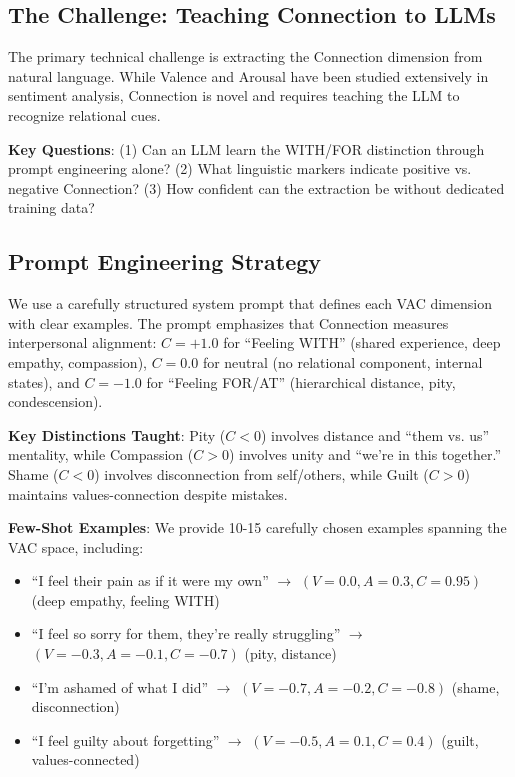 \subsection{The Challenge: Teaching Connection to LLMs}

The primary technical challenge is extracting the Connection dimension from natural language. While Valence and Arousal have been studied extensively in sentiment analysis, Connection is novel and requires teaching the LLM to recognize relational cues.

\textbf{Key Questions}: (1) Can an LLM learn the WITH/FOR distinction through prompt engineering alone? (2) What linguistic markers indicate positive vs. negative Connection? (3) How confident can the extraction be without dedicated training data?

\subsection{Prompt Engineering Strategy}

We use a carefully structured system prompt that defines each VAC dimension with clear examples. The prompt emphasizes that Connection measures interpersonal alignment: $C = +1.0$ for ``Feeling WITH'' (shared experience, deep empathy, compassion), $C = 0.0$ for neutral (no relational component, internal states), and $C = -1.0$ for ``Feeling FOR/AT'' (hierarchical distance, pity, condescension).

\textbf{Key Distinctions Taught}: Pity ($C < 0$) involves distance and ``them vs. us'' mentality, while Compassion ($C > 0$) involves unity and ``we're in this together.'' Shame ($C < 0$) involves disconnection from self/others, while Guilt ($C > 0$) maintains values-connection despite mistakes.

\textbf{Few-Shot Examples}: We provide 10-15 carefully chosen examples spanning the VAC space, including:
\begin{itemize}
    \item ``I feel their pain as if it were my own'' $\rightarrow$ $(V=0.0, A=0.3, C=0.95)$ (deep empathy, feeling WITH)
    \item ``I feel so sorry for them, they're really struggling'' $\rightarrow$ $(V=-0.3, A=-0.1, C=-0.7)$ (pity, distance)
    \item ``I'm ashamed of what I did'' $\rightarrow$ $(V=-0.7, A=-0.2, C=-0.8)$ (shame, disconnection)
    \item ``I feel guilty about forgetting'' $\rightarrow$ $(V=-0.5, A=0.1, C=0.4)$ (guilt, values-connected)
\end{itemize}

